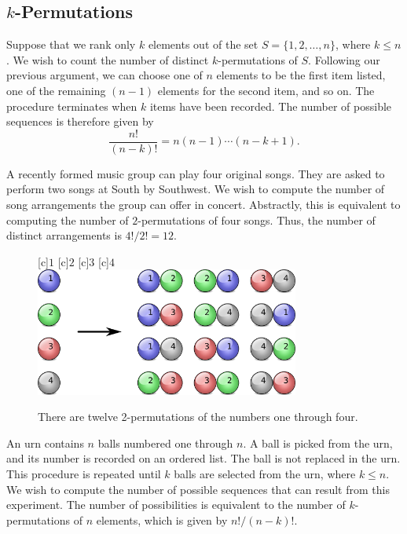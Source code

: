 \subsection{$k$-Permutations}

Suppose that we rank only $k$ elements out of the set $S = \{ 1, 2, \ldots, n \}$, where $k \leq n$.
We wish to count the number of distinct $k$-permutations of $S$.
Following our previous argument, we can choose one of $n$ elements to be the first item listed, one of the remaining $(n-1)$ elements for the second item, and so on.
The procedure terminates when $k$ items have been recorded.
The number of possible sequences is therefore given by
\begin{equation*}
\frac{n!}{(n-k)!} = n (n-1) \cdots (n-k+1) .
\end{equation*}

\begin{example}
A recently formed music group can play four original songs.
They are asked to perform two songs at South by Southwest.
We wish to compute the number of song arrangements the group can offer in concert.
Abstractly, this is equivalent to computing the number of $2$-permutations of four songs.
Thus, the number of distinct arrangements is ${4!}/{2!} = 12$.
\end{example}

\begin{figure}[htb!]
\begin{center}
\begin{psfrags}
[c]{$1$}
[c]{$2$}
[c]{$3$}
[c]{$4$}
\includegraphics[height=4.215cm]{Figures/4Chapter/kpermutation}
\end{psfrags}
\caption{There are twelve 2-permutations of the numbers one through four.}
\label{figure:Kpermutation}
\end{center}
\end{figure}

\begin{example}
An urn contains $n$ balls numbered one through $n$.
A ball is picked from the urn, and its number is recorded on an ordered list.
The ball is not replaced in the urn.
This procedure is repeated until $k$ balls are selected from the urn, where $k \leq n$.
We wish to compute the number of possible sequences that can result from this experiment.
The number of possibilities is equivalent to the number of $k$-permutations of $n$ elements, which is given by $n! / (n-k)!$.
\end{example}


